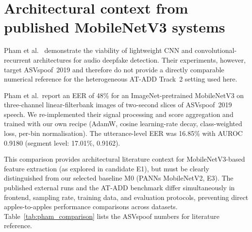 \section{Architectural context from published MobileNetV3 systems}

Pham et al.~\cite{pham2024deepfake} demonstrate the viability of lightweight CNN and convolutional-recurrent architectures for audio deepfake detection. Their experiments, however, target ASVspoof~2019 and therefore do not provide a directly comparable numerical reference for the heterogeneous AT-ADD Track~2 setting used here.

Pham et al.\ report an EER of 48\% for an ImageNet-pretrained MobileNetV3 on three-channel linear-filterbank images of two-second slices of ASVspoof~2019 speech. We re-implemented their signal processing and score aggregation and trained with our own recipe (AdamW, cosine learning-rate decay, class-weighted loss, per-bin normalisation). The utterance-level EER was 16.85\% with AUROC 0.9180 (segment level: 17.01\%, 0.9162). 

This comparison provides architectural literature context for MobileNetV3-based feature extraction (as explored in candidate E1), but must be clearly distinguished from our selected baseline M0 (PANNs MobileNetV2, E3). The published external runs and the AT-ADD benchmark differ simultaneously in frontend, sampling rate, training data, and evaluation protocols, preventing direct apples-to-apples performance comparisons across datasets. Table~\ref{tab:pham_comparison} lists the ASVspoof numbers for literature reference.

